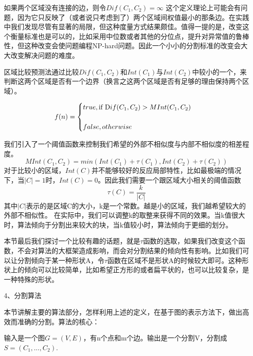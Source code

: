 如果两个区域没有连接的边，则令\(Dif(C_1,C_2) = \infty\)
这个定义理论上可能会有问题，因为它只反映了（或者说只考虑到了）两个区域间权值最小的那条边。在实践中我们发现尽管有显著的局限，但这种度量方式结果颇佳。值得一提的是，改变这个衡量标准也是可以的，比如采用中位数或者其他的分位点，提升对异常值的鲁棒性，但这种改变会使问题编程NP-hard问题。因此一个小小的分割标准的改变会大大改变解决问题的难度。

区域比较预测法通过比较\(Dif(C_1,C_2)\)和\(Int(C_1)\)与\(Int(C_2)\)中较小的一个，来判断这两个区域是否有一个边界（换言之这两个区域是否有足够的理由保持两个区域）。

\begin{equation}
f(n) =\begin{cases} 
true,   \mbox {if } \mbox Dif(C_1,C_2) > M Int(C_1,C_2)\\\\
false,  otherwise \end{cases}
\end{equation}

我们引入了一个阈值函数来控制我们希望的外部不相似度与内部不相似度的相差程度。
\begin{equation}
MInt(C_1,C_2) = min(Int(C_1) + \tau(C_1),Int(C_2) + \tau(C_2))
\end{equation}
对于比较小的区域，\(Int(C)\)并不能够较好的反应局部特性，比如最极端的情况下，当\(|C| = 1\)时，\(Int(C) = 0\)。因此我们需要一个跟区域大小相关的阈值函数
\[\tau (C) = \frac{k}{|C|}\]
其中\(|C|\)表示的是区域C的大小，k是一个常数。越是小的区域，我们越希望较大的外部不相似性。
在实际中，我们可以调整k的取整来获得不同的效果。当k值很大时，算法倾向于分割出来较大的块，当k值较小时，算法倾向于更细的划分。

本节最后我们探讨一个比较有趣的话题，就是\(\tau\)函数的选取，如果我们改变这个函数，不会对算法的大框架造成影响，而会对分割结果的倾向性有影响。比如我们可以让分割倾向于某一种形状A，令\(\tau\)函数在区域不是形状A的时候较大即可。这种形状上的倾向可以比较简单，比如希望正方形的或者扁平状的，也可以比较复杂，是一种特殊的形状。

4、分割算法

本节讲解主要的算法部分，怎样利用上述的定义，在基于图的表示方法下，做出高效而准确的分割。算法的核心：

输入是一个图\(G=(V,E)\)，有n个点和m个边。输出是一个分割V，分割成\(S=(C_1,...,C_2).\)


